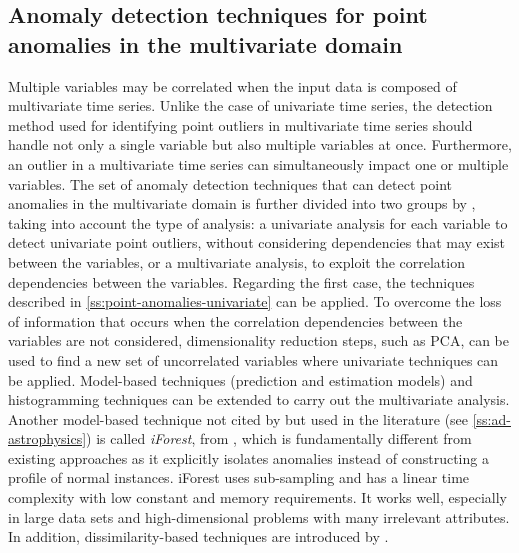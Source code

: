 \subsection{Anomaly detection techniques for point anomalies in the multivariate domain}
Multiple variables may be correlated when the input data is composed of multivariate time series. Unlike the case of univariate time series, the detection method used for identifying point outliers in multivariate time series should handle not only a single variable but also multiple variables at once. 
Furthermore, an outlier in a multivariate time series can simultaneously impact one or multiple variables. The set of anomaly detection techniques that can detect point anomalies in the multivariate domain is further divided into two groups by \cite{blazquez2020review}, taking into account the type of analysis: a univariate analysis for each variable to detect univariate point outliers, without considering dependencies that may exist between the variables, or a multivariate analysis, to exploit the correlation dependencies between the variables. Regarding the first case, the techniques described in \autoref{ss:point-anomalies-univariate} can be applied. To overcome the loss of information that occurs when the correlation dependencies between the variables are not considered, dimensionality reduction steps, such as PCA, can be used to find a new set of uncorrelated variables where univariate techniques can be applied. Model-based techniques (prediction and estimation models) and histogramming techniques can be extended to carry out the multivariate analysis. Another model-based technique not cited by \cite{blazquez2020review} but used in the literature (see \autoref{ss:ad-astrophysics}) is called \textit{iForest}, from \cite{Liu_2008}, which is fundamentally different from existing approaches as it explicitly isolates anomalies instead of constructing a profile of normal instances. iForest uses sub-sampling and has a linear time complexity with low constant and memory requirements. It works well, especially in large data sets and high-dimensional problems with many irrelevant attributes. In addition, dissimilarity-based techniques are introduced by \cite{blazquez2020review}.

